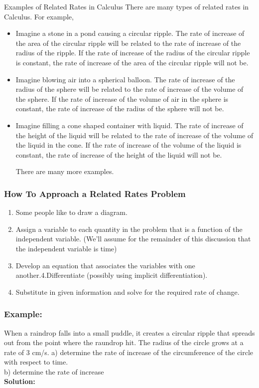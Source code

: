\documentclass{article}
\begin{document}
Examples of Related Rates in Calculus
There are many types of related rates in Calculus. For example,
\begin{itemize}

\item Imagine a stone in a pond causing a circular ripple. The rate of increase of the area of the circular ripple will be related to the rate of increase of the radius of the ripple. If the rate of increase of the radius of the circular ripple is constant, the rate of increase of the area of the circular ripple will not be.

\item Imagine blowing air into a spherical balloon. The rate of increase of the radius of the sphere will be related to the rate of increase of the volume of the sphere. If the rate of increase of the volume of air in the sphere is constant, the rate of increase of the radius of the sphere will not be.

\item Imagine filling a cone shaped container with liquid. The rate of increase of the height of the liquid will be related to the rate of increase of the volume of the liquid in the cone. If the rate of increase of the volume of the liquid is constant, the rate of increase of the height of the liquid will not be.

There are many more examples.

\end{itemize}
\subsubsection{How To Approach a Related Rates Problem}
\begin{enumerate}
\item Some people like to draw a diagram.

\item Assign a variable to each quantity in the problem that is a function of the independent variable.  (We’ll assume for the remainder of this discussion that the independent variable is time)

\item Develop an equation that associates the variables with one another.4.Differentiate (possibly using implicit differentiation).

\item Substitute in given information and solve for the required rate of change.
\end{enumerate}
\subsubsection*{Example:} 
When a raindrop falls into a small puddle, it creates a circular ripple that spreads out from the point where the raundrop hit. The radius of the circle grows at a rate of 3 cm/s.
a) determine the rate of increase of the circumference of the circle with respect to time.\\
b) determine the rate of increase \\
\textbf{Solution:}
\end{document}

